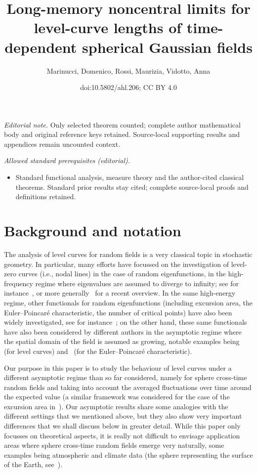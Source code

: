 \documentclass[10pt]{amsart}
\title{Long-memory noncentral limits for level-curve lengths of time-dependent spherical Gaussian fields}
\author{Marinucci, Domenico, Rossi, Maurizia, Vidotto, Anna}
\date{doi:10.5802/ahl.206; CC BY 4.0}
\theoremstyle{definition}\newtheorem{defi}[theo]{Definition}\newtheorem{rema}[theo]{Remark}\newtheorem{exam}[theo]{Example}\newtheorem{exem}[theo]{Example}\newtheorem{nota}[theo]{Notation}
\begin{document}
\maketitle
\noindent\textit{Editorial note.} Only selected theorem counted; complete author mathematical body and original reference keys retained. Source-local supporting results and appendices remain uncounted context.\par\medskip
\noindent\textit{Allowed standard prerequisites (editorial).}\begin{itemize}
\item Standard functional analysis, measure theory and the author-cited classical theorems. Standard prior results stay cited; complete source-local proofs and definitions retained.
\end{itemize}\medskip

\section{Background and notation}

The analysis of level curves for random fields is a very classical topic in stochastic geometry. In particular, many efforts have focussed on the investigation of level-zero curves (i.e., nodal lines) in the case of random eigenfunctions, in the high-frequency regime where eigenvalues are assumed to diverge to infinity; see for instance~\cite{MPRW16, NPR19, PV20,Wig}, or more generally~\cite{Wig22} for a recent overview. In the same high-energy regime, other functionals for random eigenfunctions (including excursion area, the Euler--Poincaré characteristic, the number of critical points) have also been widely investigated, see for instance~\cite {M2022}; on the other hand, these same functionals have also been considered by different authors in the asymptotic regime where the spatial domain of the field is assumed as growing, notable examples being~\cite{KL01} (for level curves) and~\cite{EL2016} (for the Euler--Poincaré characteristic).

Our purpose in this paper is to study the behaviour of level curves under a different asymptotic regime than so far considered, namely for sphere cross-time random fields and taking into account the averaged fluctuations over time around the expected value (a similar framework was considered for the case of the excursion area in~\cite{MRV:20}). Our asymptotic results share some analogies with the different settings that we mentioned above, but they also show very important differences that we shall discuss below in greater detail. While this paper only focusses on theoretical aspects, it is really not difficult to envisage application areas where sphere cross-time random fields emerge very naturally, some examples being atmospheric and climate data (the sphere representing the surface of the Earth, see~\cite {Ch:17}).
\end{document}
